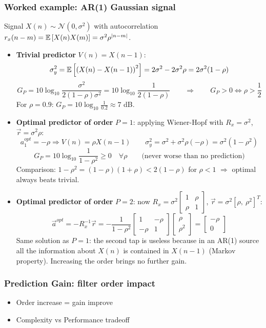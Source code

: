 \subsubsection{Worked example: AR(1) Gaussian signal}
Signal $X(n)\sim\mathcal{N}(0,\sigma^2)$ with autocorrelation $r_x(n-m) = \mathbb{E}\left[X(n)X(m)\right] = \sigma^2\rho^{|n-m|}$.
\begin{itemize}
    \item \textbf{Trivial predictor} $V(n) = X(n-1)$:
    $$\sigma^2_y = \mathbb{E}\left[\left(X(n)-X(n-1)\right)^2\right] = 2\sigma^2 - 2\sigma^2\rho = 2\sigma^2(1-\rho)$$
    $$G_P = 10\log_{10}\frac{\sigma^2}{2(1-\rho)\sigma^2} = 10\log_{10}\frac{1}{2(1-\rho)} \qquad\Longrightarrow\qquad G_P > 0 \Longleftrightarrow \rho > \frac{1}{2}$$
    For $\rho = 0.9$: $G_P = 10\log_{10}\frac{1}{0.2} \approx 7$ dB.
    \item \textbf{Optimal predictor of order} $P=1$: applying Wiener-Hopf with $R_x = \sigma^2$, $\vec{r} = \sigma^2\rho$:
    $$a_1^{opt} = -\rho \Rightarrow V(n) = \rho X(n-1) \qquad \sigma^2_y = \sigma^2 + \sigma^2\rho(-\rho) = \sigma^2(1-\rho^2)$$
    $$G_P = 10\log_{10}\frac{1}{1-\rho^2} \geq 0 \quad \forall\rho \qquad\text{(never worse than no prediction)}$$
    Comparison: $1-\rho^2 = (1-\rho)(1+\rho) < 2(1-\rho)$ for $\rho<1$ $\Rightarrow$ optimal always beats trivial.
    \item \textbf{Optimal predictor of order} $P=2$: now $R_x = \sigma^2\left[\begin{smallmatrix}1 & \rho\\ \rho & 1\end{smallmatrix}\right]$, $\vec{r} = \sigma^2[\rho,\ \rho^2]^T$:
    $$\vec{a}^{opt} = -R_x^{-1}\vec{r} = -\frac{1}{1-\rho^2}\left[\begin{matrix}1 & -\rho\\ -\rho & 1\end{matrix}\right]\left[\begin{matrix}\rho\\ \rho^2\end{matrix}\right] = \left[\begin{matrix}-\rho\\ 0\end{matrix}\right]$$
    Same solution as $P=1$: the second tap is useless because in an AR(1) source all the information about $X(n)$ is contained in $X(n-1)$ (Markov property). Increasing the order brings no further gain.
\end{itemize}
\subsubsection{Prediction Gain: filter order impact}
\begin{itemize}
    \item Order increase = gain improve
    \item Complexity vs Performance tradeoff
\end{itemize}
